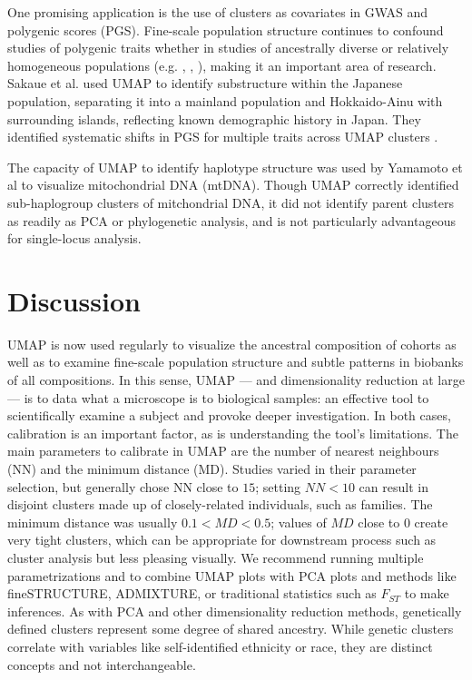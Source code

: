 \documentclass[12pt]{article}
\begin{document}
One promising application is the use of clusters as covariates in GWAS and polygenic scores (PGS). Fine-scale population structure continues to confound studies of polygenic traits whether in studies of ancestrally diverse or relatively homogeneous populations (e.g. \cite{kerminen2019geographic}, \cite{berg2019reduced}, \cite{sohail2019polygenic}), making it an important area of research. Sakaue et al. used UMAP to identify substructure within the Japanese population, separating it into a mainland population and Hokkaido-Ainu with surrounding islands, reflecting known demographic history in Japan\cite{sakaue_dimensionality_2020}. They identified systematic shifts in PGS for multiple traits across UMAP clusters . 

The capacity of UMAP to identify haplotype structure was used by Yamamoto et al to visualize mitochondrial DNA (mtDNA). Though UMAP correctly identified sub-haplogroup clusters of mitchondrial DNA, it did not identify parent clusters as readily as PCA or phylogenetic analysis, and is not particularly advantageous for single-locus analysis\cite{yamamoto_genetic_2020}.

\section*{Discussion}
UMAP is now used regularly to visualize the ancestral composition of cohorts as well as to examine fine-scale population structure and subtle patterns in biobanks of all compositions. In this sense, UMAP --- and dimensionality reduction at large --- is to data what a microscope is to biological samples: an effective tool to scientifically examine a subject and provoke deeper investigation. In both cases, calibration is an important factor, as is understanding the tool's limitations. The main parameters to calibrate in UMAP are the number of nearest neighbours (NN) and the minimum distance (MD). Studies varied in their parameter selection, but generally chose NN close to $15$; setting $NN < 10$ can result in disjoint clusters made up of closely-related individuals, such as families. The minimum distance was usually $0.1 < MD < 0.5$; values of $MD$ close to $0$ create very tight clusters, which can be appropriate for  downstream process such as cluster analysis but less pleasing visually. We recommend running multiple parametrizations and to combine UMAP plots with PCA plots and methods like fineSTRUCTURE\cite{lawson2012inference}, ADMIXTURE\cite{alexander2009fast}, or traditional statistics such as $F_{ST}$ to make inferences. As with PCA and other dimensionality reduction methods, genetically defined clusters represent some degree of shared ancestry. While genetic clusters correlate with variables like self-identified ethnicity or race, they are distinct concepts and not interchangeable\cite{mathieson2020ancestry}.
\end{document}
